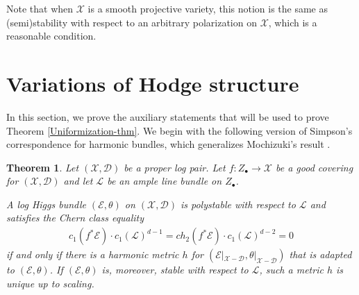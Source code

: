 \documentclass[a4paper]{amsart}
\newtheorem{theorem}{Theorem}[section]
\newtheorem{lemma}[theorem]{Lemma}
\theoremstyle{definition}
\begin{document}
Note that when $\mathscr{X}$ is a smooth projective variety, this notion is the same as (semi)stability with respect to an arbitrary polarization on $\mathscr{X}$, which is a reasonable condition.


\section{Variations of Hodge structure}

In this section, we prove the auxiliary statements that will be used to prove Theorem \ref{Uniformization-thm}. We begin with the following version of Simpson's correspondence for harmonic bundles, which generalizes Mochizuki's result \cite[Theorem 1.4]{mochizuki_asterisque}.

\begin{theorem}\label{correspondence}
Let $(\mathscr{X},\mathscr{D})$ be a proper log pair. Let $f:Z_\bullet\to\mathscr{X}$ be a good covering for $(\mathscr{X},\mathscr{D})$ and let $\mathcal{L}$ be an ample line bundle on $Z_\bullet$. 

A log Higgs bundle $(\mathcal{E},\theta)$ on $(\mathscr{X},\mathscr{D})$ is polystable with respect to $\mathcal{L}$ and satisfies the Chern class equality
\begin{align}\label{cherncleq}
c_1(f^*\mathcal{E})\cdot c_1(\mathcal{L})^{d-1}=ch_2(f^*\mathcal{E})\cdot c_1(\mathcal{L})^{d-2}=0 
\end{align}
if and only if there is a harmonic metric $h$ for $(\mathcal{E}|_{\mathscr{X}-\mathscr{D}},\theta|_{\mathscr{X}-\mathscr{D}})$ that is adapted to $(\mathcal{E},\theta)$. If $(\mathcal{E},\theta)$ is, moreover, stable with respect to $\mathcal{L}$, such a metric $h$ is unique up to scaling. 
\end{theorem}
\end{document}
